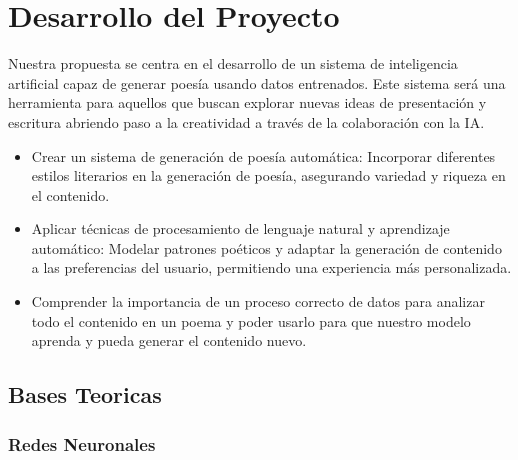 \section{Desarrollo del Proyecto}

Nuestra propuesta se centra en el desarrollo de un sistema de inteligencia artificial capaz 
de generar poesía usando datos entrenados. Este sistema será una herramienta para aquellos 
que buscan explorar nuevas ideas de presentación y escritura abriendo paso a la creatividad 
a través de la colaboración con la IA.

\begin{itemize}
    \item Crear un sistema de generación de poesía automática: Incorporar diferentes estilos 
    literarios en la generación de poesía, asegurando variedad y riqueza en el contenido.

    \item Aplicar técnicas de procesamiento de lenguaje natural y aprendizaje automático: 
    Modelar patrones poéticos y adaptar la generación de contenido a las preferencias del 
    usuario, permitiendo una experiencia más personalizada.

    \item Comprender la importancia de un proceso correcto de datos para analizar todo el contenido
    en un poema y poder usarlo para que nuestro modelo aprenda y pueda generar el contenido nuevo. 
\end{itemize}

\subsection{Bases Teoricas}

\subsubsection*{Redes Neuronales}


